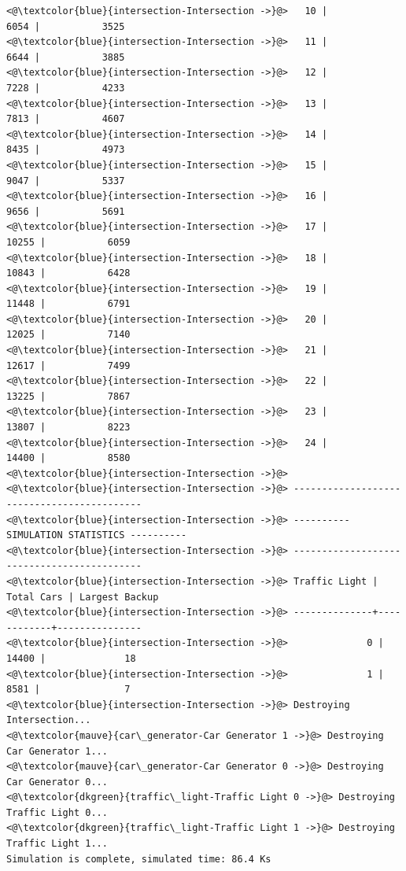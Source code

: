 \documentclass{article}
\begin{document}
\begin{lstlisting}[caption={Sample Simulation Output}, captionpos=b]
<@\textcolor{blue}{intersection-Intersection ->}@>   10 |             6054 |           3525
<@\textcolor{blue}{intersection-Intersection ->}@>   11 |             6644 |           3885
<@\textcolor{blue}{intersection-Intersection ->}@>   12 |             7228 |           4233
<@\textcolor{blue}{intersection-Intersection ->}@>   13 |             7813 |           4607
<@\textcolor{blue}{intersection-Intersection ->}@>   14 |             8435 |           4973
<@\textcolor{blue}{intersection-Intersection ->}@>   15 |             9047 |           5337
<@\textcolor{blue}{intersection-Intersection ->}@>   16 |             9656 |           5691
<@\textcolor{blue}{intersection-Intersection ->}@>   17 |            10255 |           6059
<@\textcolor{blue}{intersection-Intersection ->}@>   18 |            10843 |           6428
<@\textcolor{blue}{intersection-Intersection ->}@>   19 |            11448 |           6791
<@\textcolor{blue}{intersection-Intersection ->}@>   20 |            12025 |           7140
<@\textcolor{blue}{intersection-Intersection ->}@>   21 |            12617 |           7499
<@\textcolor{blue}{intersection-Intersection ->}@>   22 |            13225 |           7867
<@\textcolor{blue}{intersection-Intersection ->}@>   23 |            13807 |           8223
<@\textcolor{blue}{intersection-Intersection ->}@>   24 |            14400 |           8580
<@\textcolor{blue}{intersection-Intersection ->}@> 
<@\textcolor{blue}{intersection-Intersection ->}@> -------------------------------------------
<@\textcolor{blue}{intersection-Intersection ->}@> ---------- SIMULATION STATISTICS ----------
<@\textcolor{blue}{intersection-Intersection ->}@> -------------------------------------------
<@\textcolor{blue}{intersection-Intersection ->}@> Traffic Light | Total Cars | Largest Backup
<@\textcolor{blue}{intersection-Intersection ->}@> --------------+------------+---------------
<@\textcolor{blue}{intersection-Intersection ->}@>              0 |       14400 |              18
<@\textcolor{blue}{intersection-Intersection ->}@>              1 |        8581 |               7
<@\textcolor{blue}{intersection-Intersection ->}@> Destroying Intersection...
<@\textcolor{mauve}{car\_generator-Car Generator 1 ->}@> Destroying Car Generator 1...
<@\textcolor{mauve}{car\_generator-Car Generator 0 ->}@> Destroying Car Generator 0...
<@\textcolor{dkgreen}{traffic\_light-Traffic Light 0 ->}@> Destroying Traffic Light 0...
<@\textcolor{dkgreen}{traffic\_light-Traffic Light 1 ->}@> Destroying Traffic Light 1...
Simulation is complete, simulated time: 86.4 Ks
\end{lstlisting}
\end{document}
